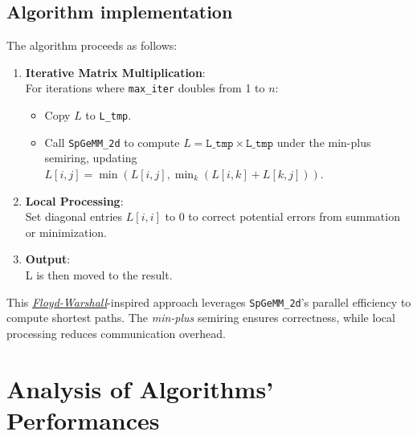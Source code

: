 \documentclass[11pt]{article}
\begin{document}
\subsection{Algorithm implementation}
The algorithm proceeds as follows:
\begin{enumerate}
    \item \textbf{Iterative Matrix Multiplication}:\\
        For iterations where \texttt{max\_iter} doubles from 1 to $n$:
        \begin{itemize}[topsep=0pt, itemsep=0pt]
            \item Copy $L$ to \texttt{L\_tmp}.
            \item Call \texttt{SpGeMM\_2d} to compute $L = \texttt{L\_tmp} \times \texttt{L\_tmp}$ under the min-plus semiring, updating $L[i,j] = \min(L[i,j], \min_k (L[i,k] + L[k,j]))$.
        \end{itemize}

    \item \textbf{Local Processing}:\\
           {\color{black} Set diagonal entries $L[i,i]$ to 0 to correct potential errors from summation or minimization.}

    \item \textbf{Output}:\\
          	L is then moved to the result. 
\end{enumerate}

This \href{https://en.wikipedia.org/wiki/Floyd\%E2\%80\%93Warshall_algorithm}{\textit{Floyd-Warshall}}-inspired approach leverages \texttt{SpGeMM\_2d}’s parallel efficiency to compute shortest paths.  
The \textit{min-plus} semiring ensures correctness, while local processing reduces communication overhead.

\newpage
\section{Analysis of Algorithms' Performances}
\end{document}
